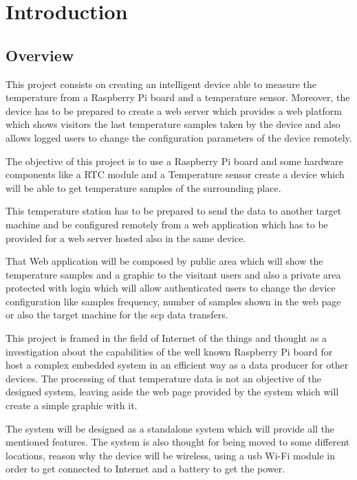 
\chapter{Introduction}
	\section{Overview}
	This project consists on creating an intelligent device able to measure the temperature from a Raspberry Pi board and a temperature sensor. Moreover, the device has to be prepared to create a web server which provides a web platform which shows visitors the last temperature samples taken by the device and also allows logged users to change the configuration parameters of the device remotely.

	The objective of this project is to use a Raspberry Pi board and some hardware components like a RTC module and a Temperature sensor create a device which will be able to get temperature samples of the surrounding place.

	This temperature station has to be prepared to send the data to another target machine and be configured remotely from a web application which has to be provided for a web server hosted also in the same device.

	That Web application will be composed by public area which will show the temperature samples and a graphic to the visitant users and also a private area protected with login which will allow authenticated users to change the device configuration like samples frequency, number of samples shown in the web page or also the target machine for the scp data transfers.

	This project is framed in the field of Internet of the things and thought as a investigation about the capabilities of the well known Raspberry Pi board for host a complex embedded system in an efficient way as a data producer for other devices. The processing of that temperature data is not an objective of the designed system, leaving aside the web page provided by the system which will create a simple graphic with it.

	The system will be designed as a standalone system which will provide all the mentioned features. The system is also thought for being moved to some different locations, reason why the device will be wireless, using a usb Wi-Fi module in order to get connected to Internet and a battery to get the power.

